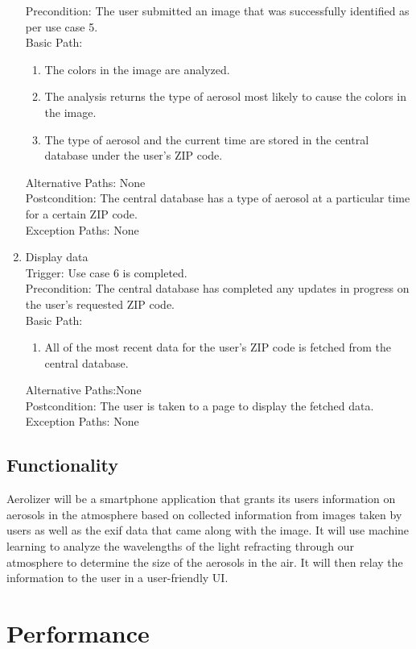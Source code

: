 \documentclass[journal,10pt,draftclsnofoot,onecolumn]{IEEEtran}
\begin{document}
\begin{singlespace}
\begin{enumerate}
Precondition: The user submitted an image that was successfully identified as per use case 5.\\
Basic Path:\begin{enumerate}
\item The colors in the image are analyzed.
\item The analysis returns the type of aerosol most likely to cause the colors in the image.
\item The type of aerosol and the current time are stored in the central database under the user's ZIP code.
\end{enumerate}
Alternative Paths: None\\
Postcondition: The central database has a type of aerosol at a particular time for a certain ZIP code.\\
Exception Paths: None
\\
\item Display data\\
Trigger: Use case 6 is completed.\\
Precondition: The central database has completed any updates in progress on the user's requested ZIP code.\\
Basic Path: \begin{enumerate}
\item All of the most recent data for the user's ZIP code is fetched from the central database.
\end{enumerate}
Alternative Paths:None\\
Postcondition: The user is taken to a page to display the fetched data.\\
Exception Paths: None
\end{enumerate}

\subsection{Functionality}
Aerolizer will be a smartphone application that grants its users information on aerosols in the atmosphere based on collected information from images taken by users as well as the exif data that came along with the image. It will use machine learning to analyze the wavelengths of the light refracting through our atmosphere to determine the size of the aerosols in the air. It will then relay the information to the user in a user-friendly UI. 

\section{Performance}

\end{singlespace}
\end{document}
